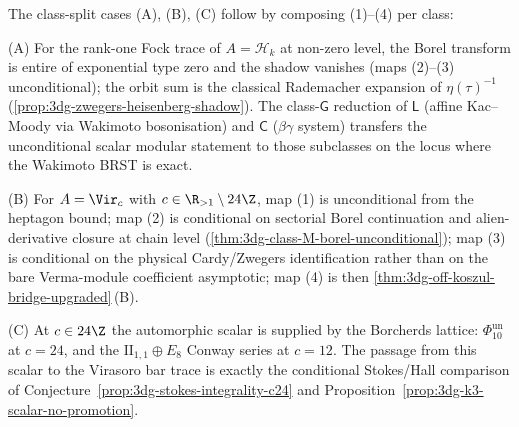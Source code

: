 \begin{remark}
The class-split cases \textup{(A)}, \textup{(B)}, \textup{(C)}
follow by composing (1)--(4) per class:

\textup{(A)} For the rank-one Fock trace of
\(A=\mathcal H_k\) at non-zero level, the Borel transform is entire of
exponential type zero and the shadow vanishes (maps (2)--(3)
unconditional); the orbit sum is the classical Rademacher expansion of
\(\eta(\tau)^{-1}\)
(\autoref{prop:3dg-zwegers-heisenberg-shadow}).
The class-$\mathsf G$ reduction of $\mathsf L$ (affine Kac--Moody via
Wakimoto bosonisation) and $\mathsf C$ ($\beta\gamma$ system)
transfers the unconditional scalar modular statement to those subclasses on the
locus where the Wakimoto BRST is exact.

\textup{(B)} For \(A = \Vir_{c}\) with \(c \in \R_{> 1} \setminus 24\Z\),
map (1) is unconditional from the heptagon bound; map (2) is
conditional on sectorial Borel continuation and alien-derivative
closure at chain level
(\autoref{thm:3dg-class-M-borel-unconditional}); map (3) is
conditional on the physical Cardy/Zwegers identification rather than
on the bare Verma-module coefficient asymptotic; map (4) is then
\autoref{thm:3dg-off-koszul-bridge-upgraded}\,\textup{(B)}.

\textup{(C)} At \(c\in24\Z\) the automorphic scalar is supplied by
the Borcherds lattice: \(\Phi_{10}^{\mathrm{un}}\) at \(c=24\), and the
\(\mathrm{II}_{1,1}\oplus E_8\) Conway series at \(c=12\).
The passage from this scalar to the Virasoro bar trace is exactly the
conditional Stokes/Hall comparison of
Conjecture~\ref{prop:3dg-stokes-integrality-c24} and
Proposition~\ref{prop:3dg-k3-scalar-no-promotion}.
\end{remark}

